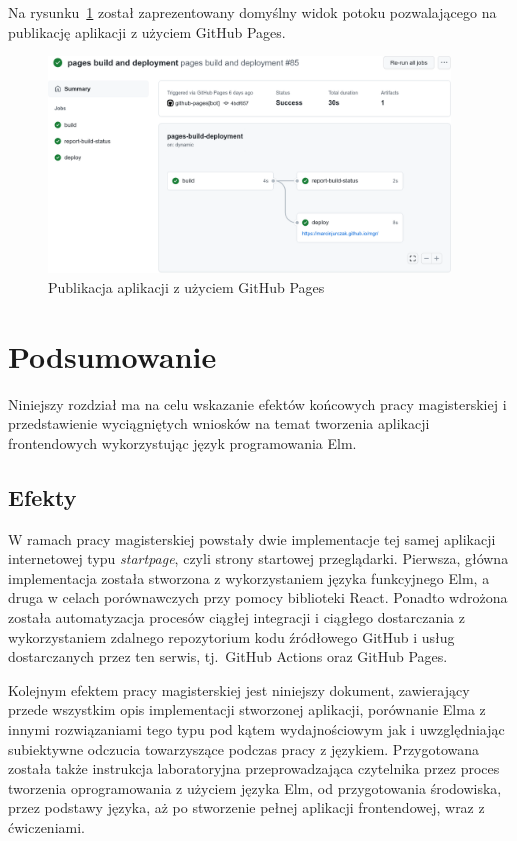 \documentclass[twoside,a4paper]{report}
\begin{document}
Na rysunku~\ref{fig:deploy_yml} został zaprezentowany domyślny widok potoku pozwalającego na publikację aplikacji z użyciem GitHub Pages.
\begin{figure}[H]
    \centering
    \includegraphics[width=0.95\textwidth]{img/deploy_yml.png}
    \caption{Publikacja aplikacji z użyciem GitHub Pages}\label{fig:deploy_yml}
\end{figure}


\chapter{Podsumowanie}
Niniejszy rozdział ma na celu wskazanie efektów końcowych pracy magisterskiej i przedstawienie wyciągniętych wniosków na temat tworzenia aplikacji frontendowych wykorzystując język programowania Elm.

\section{Efekty}
W ramach pracy magisterskiej powstały dwie implementacje tej samej aplikacji internetowej typu \textit{startpage}, czyli strony startowej przeglądarki.
Pierwsza, główna implementacja została stworzona z wykorzystaniem języka funkcyjnego Elm, a druga w celach porównawczych przy pomocy biblioteki React.
Ponadto wdrożona została automatyzacja procesów ciągłej integracji i ciągłego dostarczania z wykorzystaniem zdalnego repozytorium kodu źródłowego GitHub i usług dostarczanych przez ten serwis, tj.~GitHub Actions oraz GitHub Pages.

Kolejnym efektem pracy magisterskiej jest niniejszy dokument, zawierający przede wszystkim opis implementacji stworzonej aplikacji, porównanie Elma z innymi rozwiązaniami tego typu pod kątem wydajnościowym jak i uwzględniając subiektywne odczucia towarzyszące podczas pracy z językiem.
Przygotowana została także instrukcja laboratoryjna przeprowadzająca czytelnika przez proces tworzenia oprogramowania z użyciem języka Elm, od przygotowania środowiska, przez podstawy języka, aż po stworzenie pełnej aplikacji frontendowej, wraz z ćwiczeniami.
\end{document}
